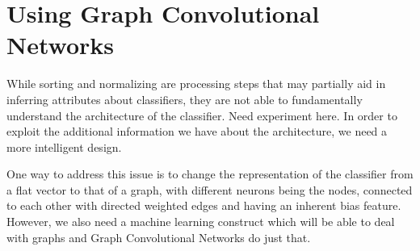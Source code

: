 \chapter{Using Graph Convolutional Networks}
While sorting and normalizing are processing steps that may partially aid in inferring attributes about classifiers, they are not able to fundamentally understand the architecture of the classifier. {\color{RubineRed} Need experiment here.} In order to exploit the additional information we have about the architecture, we need a more intelligent design.

One way to address this issue is to change the representation of the classifier from a flat vector to that of a graph, with different neurons being the nodes, connected to each other with directed weighted edges and having an inherent bias feature. However, we also need a machine learning construct which will be able to deal with graphs and Graph Convolutional Networks do just that.

